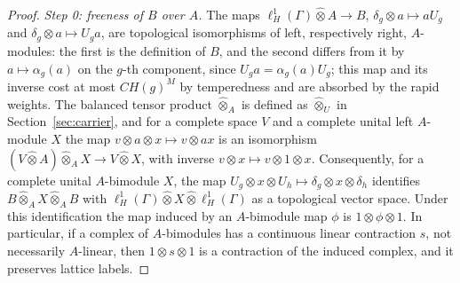 \documentclass[11pt]{amsart}
\theoremstyle{definition}
\theoremstyle{remark}
\begin{document}
\begin{proof}
\emph{Step 0: freeness of $B$ over $A$.}  The maps
$\ell^{1}_{H}(\Gamma)\widehat\otimes A\to B$, $\delta_g\otimes a\mapsto
aU_g$ and $\delta_g\otimes a\mapsto U_ga$, are topological isomorphisms of
left, respectively right, $A$-modules: the first is the definition of $B$,
and the second differs from it by $a\mapsto\alpha_g(a)$ on the $g$-th
component, since $U_ga=\alpha_g(a)U_g$; this map and its inverse cost at most
$CH(g)^{M}$ by temperedness and are absorbed by the rapid weights.
The balanced tensor product $\widehat\otimes_A$ is defined as
$\widehat\otimes_U$ in Section~\ref{sec:carrier}, and for a complete space $V$
and a complete unital left $A$-module $X$ the map $v\otimes a\otimes x\mapsto
v\otimes ax$ is an isomorphism $(V\widehat\otimes A)\widehat\otimes_AX\to
V\widehat\otimes X$, with inverse $v\otimes x\mapsto v\otimes1\otimes x$.
Consequently, for a complete unital $A$-bimodule $X$, the map $U_g\otimes x\otimes
U_h\mapsto\delta_g\otimes x\otimes\delta_h$ identifies
$B\widehat\otimes_AX\widehat\otimes_AB$ with $\ell^{1}_{H}(\Gamma)\widehat
\otimes X\widehat\otimes\ell^{1}_{H}(\Gamma)$ as a topological vector space.
Under this identification the map induced by an $A$-bimodule map $\phi$ is
$1\otimes\phi\otimes1$.  In particular, if a complex of $A$-bimodules has a
continuous linear contraction $s$, not necessarily $A$-linear, then
$1\otimes s\otimes1$ is a contraction of the induced complex, and it preserves
lattice labels.


\end{proof}
\end{document}
